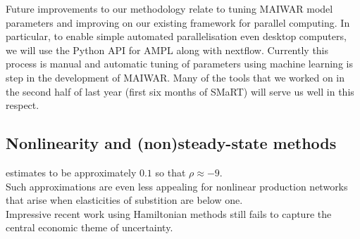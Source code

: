 \documentclass[12pt,a4paper,twoside, draft]{article}
\begin{document}
Future improvements to our methodology relate to tuning MAIWAR model
parameters and improving on our existing framework for parallel computing.
In particular, to enable simple automated parallelisation even desktop
computers, we will use the Python API for AMPL along with nextflow.
Currently this process is manual and automatic tuning of parameters using
machine learning is  step in the development of MAIWAR.
Many of the tools that we worked on in the second half of last year (first six
months of SMaRT) will serve us well in this respect.

\subsection{Nonlinearity and (non)steady-state methods}

\citet{Atalay-Sectoral_shocks} estimates to be approximately $0.1$ so that
$\rho \approx -9$.
\\
Such approximations are even less appealing for nonlinear production networks
that arise when elasticities of substition are below one.
\\
Impressive recent work using Hamiltonian methods still fails to capture
the central economic theme of uncertainty.


 
\end{document}

